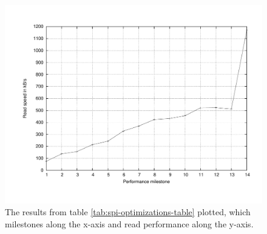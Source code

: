 \begin{figure}[h!]
\centering
\includegraphics[width=\textwidth]{fig/avr/spi-optimizations-plot.pdf}
\caption[SPI Optimizations Plot]{The results from table
\ref{tab:spi-optimizations-table} plotted, which milestones along the
x-axis and read performance along the y-axis.}
\label{fig:spi-optimizations-plot}
\end{figure}
